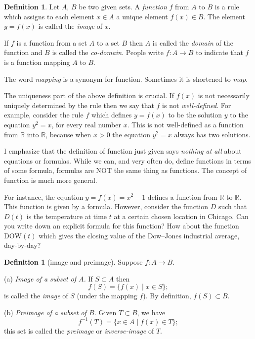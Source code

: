 \documentclass[11pt]{article}
\theoremstyle{definition}
\newtheorem{defn}[thm]{Definition}
\newcommand{\R}{\mathbb{R}} %
\begin{document}
\begin{defn}
Let $A$, $B$ be two given sets. A {\em function} $f$ from $A$ to $B$
is a rule which assigns to each element $x\in A$ a unique element
$f(x) \in B$. The element $y=f(x)$ is called the {\em image} of $x$.

If $f$ is a function from a set $A$ to a set $B$ then $A$ is called
the {\em domain} of the function and $B$ is called the
{\em co-domain}. People write $f: A \to B$ to
indicate that $f$ is a function mapping $A$ to $B$.
\end{defn}

The word {\em mapping} is a synonym for
function. Sometimes it is shortened to \emph{map}.

The uniqueness part of the above definition is crucial. If $f(x)$ is
not necessarily uniquely determined by the rule then we say that $f$
is not {\em well-defined}. For example, consider the rule $f$ which
defines $y=f(x)$ to be the solution $y$ to the equation $y^2=x$, for
every real number $x$. This is not well-defined as a function from
$\R$ into $\R$, because when $x>0$ the equation $y^2=x$ always has two
solutions.

I emphasize that the definition of function just given says {\em
nothing at all} about equations or formulas. While we can, and very
often do, define functions in terms of some formula, formulas are NOT
the same thing as functions. The concept of function is much more
general.

For instance, the equation $y = f(x) = x^2 - 1$ defines a function
from $\R$ to $\R$. This function is given by a formula. However,
consider the function $D$ such that $D(t)$ is the temperature at time
$t$ at a certain chosen location in Chicago. Can you write down an
explicit formula for this function? How about the function
$\text{DOW}(t)$ which gives the closing value of the Dow--Jones
industrial average, day-by-day?



\begin{defn}[image and preimage]
Suppose $f: A \to B$. 

(a) \emph{Image of a subset of $A$.} If $S \subset A$ then 
$$
f(S) = \{f(x) \mid x \in S\};
$$ is called the {\em image} of $S$ (under the mapping $f$). By
definition, $f(S) \subset B$.  

(b) \emph{Preimage of a subset of $B$.} Given $T \subset B$, we have 
$$
f^{-1}(T) = \{ x \in A \mid f(x) \in T \};
$$
this set is called the {\em preimage} or {\em inverse-image} of $T$.
\end{defn}
\end{document}
